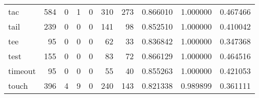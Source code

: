 \begin{tabular}{lrrrrrrrrr}
tac       &                                   584 &                                                  0 &                                                  1 &                                                  0 &                                                310 &                                                273 &                                           0.866010 &                               1.000000 &                             0.467466 \\
tail      &                                   239 &                                                  0 &                                                  0 &                                                  0 &                                                141 &                                                 98 &                                           0.852510 &                               1.000000 &                             0.410042 \\
tee       &                                    95 &                                                  0 &                                                  0 &                                                  0 &                                                 62 &                                                 33 &                                           0.836842 &                               1.000000 &                             0.347368 \\
test      &                                   155 &                                                  0 &                                                  0 &                                                  0 &                                                 83 &                                                 72 &                                           0.866129 &                               1.000000 &                             0.464516 \\
timeout   &                                    95 &                                                  0 &                                                  0 &                                                  0 &                                                 55 &                                                 40 &                                           0.855263 &                               1.000000 &                             0.421053 \\
touch     &                                   396 &                                                  4 &                                                  9 &                                                  0 &                                                240 &                                                143 &                                           0.821338 &                               0.989899 &                             0.361111 \\

\end{tabular}
